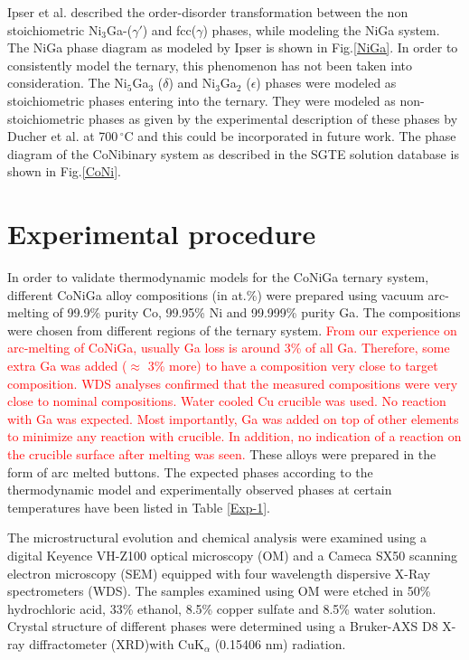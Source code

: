 \documentclass[article]{elsarticle}
\begin{document}
Ipser et al. \cite{Ipser04} described the order-disorder transformation between the
non stoichiometric Ni$_{3}$Ga-($\gamma'$)
and fcc($\gamma$) phases, while modeling the NiGa system. The NiGa phase diagram as modeled by Ipser is shown in Fig.\ref{NiGa}. In order to consistently model the ternary,
this phenomenon has not been taken into consideration. The Ni$_5$Ga$_3$ ($\delta$) and Ni$_3$Ga$_2$
($\epsilon$) phases were modeled as stoichiometric phases entering into the ternary. They were
modeled as non-stoichiometric phases as given by the
experimental description of these phases by Ducher et al. \cite{Duch08} at 700$\,^{\circ}\mathrm{C}$
and this could be incorporated in future work. The phase diagram of the CoNibinary 
system as described in the SGTE solution database is shown in Fig.\ref{CoNi}.

\section{Experimental procedure}
\label{Sec:exp_proc}
In order to validate thermodynamic models for the CoNiGa ternary system, different CoNiGa alloy compositions (in at.\%)
were prepared using vacuum arc-melting of 99.9\% purity Co, 99.95\% Ni and 99.999\% purity Ga.
The compositions were chosen from different regions of the ternary system. \textcolor{red}{From our experience on arc-melting of CoNiGa, usually Ga loss is around 3\% of all Ga. Therefore, some extra Ga  was added ($\approx$ 3\% more) to have a composition very close to target composition. WDS analyses confirmed that the measured compositions were very close to nominal compositions. Water cooled Cu crucible was used. No reaction with Ga was expected. Most importantly, Ga was added on top of other elements to minimize any reaction with crucible. In addition, no indication of a reaction on the crucible surface after melting was seen.} These alloys were prepared in the form of
arc melted buttons. The expected phases according to the thermodynamic model and experimentally
observed phases at certain temperatures have been listed in Table \ref{Exp-1}.

The microstructural evolution and chemical analysis were examined using a digital Keyence VH-Z100 optical microscopy (OM)
and a Cameca SX50 scanning electron microscopy (SEM) equipped with four wavelength dispersive X-Ray spectrometers (WDS).
The samples examined using OM were etched in 50\% hydrochloric acid, 33\% ethanol, 8.5\% copper sulfate
and 8.5\% water solution. Crystal structure of different phases were determined using a
Bruker-AXS D8 X-ray diffractometer (XRD)with CuK$_{\alpha}$ (0.15406 nm) radiation.
\end{document}
